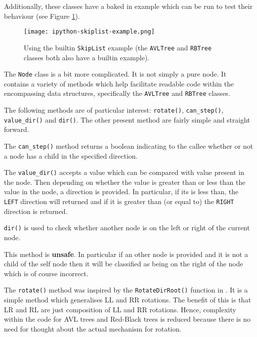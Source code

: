 \documentclass[article]{uom-coursework}
\begin{document}
Additionally, these classes have a baked in example which can be
run to test their behaviour (see Figure \ref{fig:example}).

\begin{figure}[H]
\centering
\texttt{[image: ipython-skiplist-example.png]}
\caption{Using the builtin \texttt{SkipList} example (the
\texttt{AVLTree} and \texttt{RBTree} classes both also have a
builtin example).}
\label{fig:example}
\end{figure}

The \texttt{Node} class is a bit more complicated. It is not
simply a pure node. It contains a variety of methods which help
facilitate readable code within the encompassing data
structures, specifically the \texttt{AVLTree} and
\texttt{RBTree} classes.

The following methods are of particular interest:
\texttt{rotate()}, \texttt{can\_step()}, \texttt{value\_dir()}
and \texttt{dir()}. The other present method are fairly simple
and straight forward.

The \texttt{can\_step()} method returns a boolean indicating to
the callee whether or not a node has a child in the specified
direction.

The \texttt{value\_dir()} accepts a value which can be compared
with value present in the node. Then depending on whether the
value is greater than or less than the value in the node, a
direction is provided. In particular, if its is less than, the
\texttt{LEFT} direction will returned and if it is greater than
(or equal to) the \texttt{RIGHT} direction is returned.

\texttt{dir()} is used to check whether another node is on the
left or right of the current node.

\begin{note}
This method is \textbf{unsafe}. In particular if an other node
is provided and it is not a child of the self node then it will
be classified as being on the right of the node which is of
course incorrect.
\end{note}

The \texttt{rotate()} method was inspired by the
\texttt{RotateDirRoot()} function in \textcite{wikirbtree}. It
is a simple method which generalises LL and RR rotations. The
benefit of this is that LR and RL are just composition of LL and
RR rotations. Hence, complexity within the code for AVL trees
and Red-Black trees is reduced because there is no need for
thought about the actual mechanism for rotation.
\end{document}
